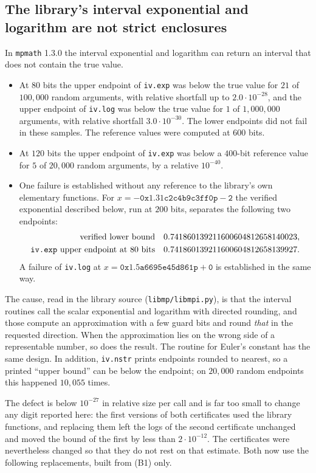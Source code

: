 \subsection{The library's interval exponential and logarithm are not strict enclosures}
\label{sec:certificates-defect}

In \texttt{mpmath} 1.3.0 the interval exponential and logarithm can return an interval that
does not contain the true value.
\begin{itemize}
\item At $80$ bits the upper endpoint of \texttt{iv.exp} was below the true value for $21$ of
$100{,}000$ random arguments, with relative shortfall up to $2.0\cdot10^{-28}$, and the
upper endpoint of \texttt{iv.log} was below the true value for $1$ of $1{,}000{,}000$
arguments, with relative shortfall $3.0\cdot10^{-30}$. The lower endpoints did not fail in
these samples. The reference values were computed at $600$ bits.
\item At $120$ bits the upper endpoint of \texttt{iv.exp} was below a $400$-bit reference
value for $5$ of $20{,}000$ random arguments, by a relative $10^{-40}$.
\item One failure is established without any reference to the library's own elementary
functions. For $x=-\mathtt{0x1.31c2c4b9c3ff0p{-}2}$ the verified exponential described below,
run at $200$ bits, separates the following two endpoints:
\[
\begin{aligned}
 \text{verified lower bound}\quad &0.741860139211600604812658140023,\\
 \text{\texttt{iv.exp} upper endpoint at 80 bits}\quad &0.741860139211600604812658139927.
\end{aligned}
\] A failure of
\texttt{iv.log} at $x=\mathtt{0x1.5a6695e45d861p{+}0}$ is established in the same way.
\end{itemize}
The cause, read in the library source (\texttt{libmp/libmpi.py}), is that the interval
routines call the scalar exponential and logarithm with directed rounding, and those compute
an approximation with a few guard bits and round \emph{that} in the requested direction. When
the approximation lies on the wrong side of a representable number, so does the result. The
routine for Euler's constant has the same design. In addition, \texttt{iv.nstr} prints
endpoints rounded to nearest, so a printed ``upper bound'' can be below the endpoint; on
$20{,}000$ random endpoints this happened $10{,}055$ times.

The defect is below $10^{-27}$ in relative size per call and is far too small to change any
digit reported here: the first versions of both certificates used the library functions,
and replacing them left the logs of the second certificate unchanged and moved the bound of
the first by less than $2\cdot10^{-12}$. The certificates were nevertheless changed so that
they do not rest on that estimate. Both now use the following replacements, built from (B1) only.

